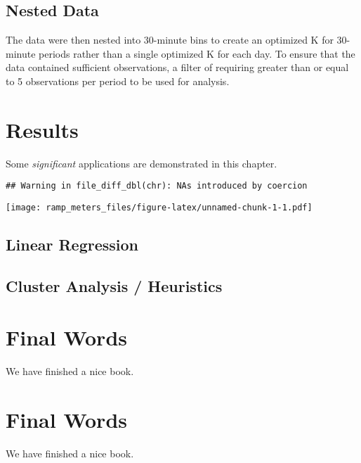 \documentclass[numbered]{trbarticle}
\begin{document}
\hypertarget{nested-data}{%
\subsection{Nested Data}\label{nested-data}}

The data were then nested into 30-minute bins to create an optimized K for 30-minute periods rather than a single optimized K for each day. To ensure that the data contained sufficient observations, a filter of requiring greater than or equal to 5 observations per period to be used for analysis.

\hypertarget{results}{%
\section{Results}\label{results}}

Some \emph{significant} applications are demonstrated in this chapter.

\begin{verbatim}
## Warning in file_diff_dbl(chr): NAs introduced by coercion
\end{verbatim}

\texttt{[image: ramp\_meters\_files/figure-latex/unnamed-chunk-1-1.pdf]}

\hypertarget{linear-regression}{%
\subsection{Linear Regression}\label{linear-regression}}

\hypertarget{cluster-analysis-heuristics}{%
\subsection{Cluster Analysis / Heuristics}\label{cluster-analysis-heuristics}}

\hypertarget{final-words}{%
\section{Final Words}\label{final-words}}

We have finished a nice book.

\hypertarget{final-words-1}{%
\section{Final Words}\label{final-words-1}}

We have finished a nice book.
\end{document}
